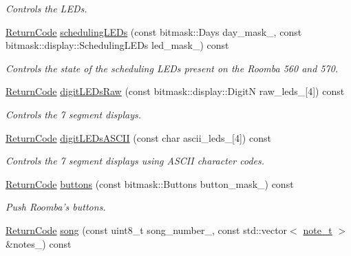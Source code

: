 \begin{DoxyCompactItemize}
\begin{DoxyCompactList}\small\item\em Controls the L\+E\+Ds. \end{DoxyCompactList}\item 
\hyperlink{classroomba_1_1series500_1_1_open_interface_a43fc2ae1216e57cfb46901331b9ab4c7}{Return\+Code} \hyperlink{classroomba_1_1series500_1_1_open_interface_a85c35ebdfac719346777f2d4e8080431}{scheduling\+L\+E\+Ds} (const bitmask\+::\+Days day\+\_\+mask\+\_\+, const bitmask\+::display\+::\+Scheduling\+L\+E\+Ds led\+\_\+mask\+\_\+) const 
\begin{DoxyCompactList}\small\item\em Controls the state of the scheduling L\+E\+Ds present on the Roomba 560 and 570. \end{DoxyCompactList}\item 
\hyperlink{classroomba_1_1series500_1_1_open_interface_a43fc2ae1216e57cfb46901331b9ab4c7}{Return\+Code} \hyperlink{classroomba_1_1series500_1_1_open_interface_a803df2fd6f194189df5c8c10e1048f5a}{digit\+L\+E\+Ds\+Raw} (const bitmask\+::display\+::\+Digit\+N raw\+\_\+leds\+\_\+\mbox{[}4\mbox{]}) const 
\begin{DoxyCompactList}\small\item\em Controls the 7 segment displays. \end{DoxyCompactList}\item 
\hyperlink{classroomba_1_1series500_1_1_open_interface_a43fc2ae1216e57cfb46901331b9ab4c7}{Return\+Code} \hyperlink{classroomba_1_1series500_1_1_open_interface_a64fd0fd3302fbed381f9227914a6095c}{digit\+L\+E\+Ds\+A\+S\+C\+I\+I} (const char ascii\+\_\+leds\+\_\+\mbox{[}4\mbox{]}) const 
\begin{DoxyCompactList}\small\item\em Controls the 7 segment displays using A\+S\+C\+I\+I character codes. \end{DoxyCompactList}\item 
\hyperlink{classroomba_1_1series500_1_1_open_interface_a43fc2ae1216e57cfb46901331b9ab4c7}{Return\+Code} \hyperlink{classroomba_1_1series500_1_1_open_interface_a1f9fcb9cf787c15c7323c0e56755579a}{buttons} (const bitmask\+::\+Buttons button\+\_\+mask\+\_\+) const 
\begin{DoxyCompactList}\small\item\em Push Roomba’s buttons. \end{DoxyCompactList}\item 
\hyperlink{classroomba_1_1series500_1_1_open_interface_a43fc2ae1216e57cfb46901331b9ab4c7}{Return\+Code} \hyperlink{classroomba_1_1series500_1_1_open_interface_a1947d81511ad33a3ffe8432fa5957845}{song} (const uint8\+\_\+t song\+\_\+number\+\_\+, const std\+::vector$<$ \hyperlink{classroomba_1_1series500_1_1_open_interface_a0c3ce39185b625b630aa156be63fd57c}{note\+\_\+t} $>$ \&notes\+\_\+) const 

\end{DoxyCompactItemize}
